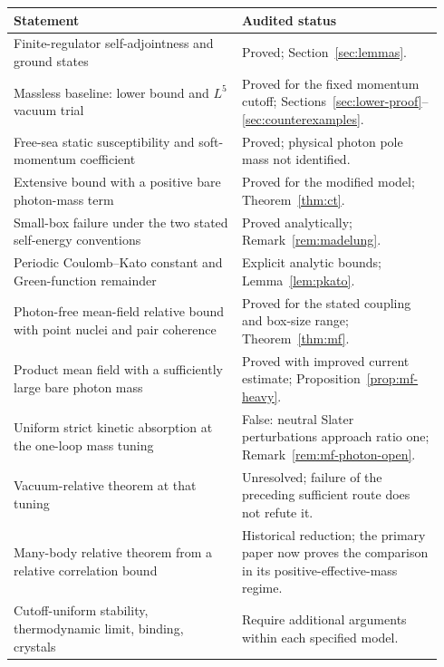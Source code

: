 \small
\noindent
\begin{tabular}{@{}>{\raggedright\arraybackslash}p{0.50\linewidth}
>{\raggedright\arraybackslash}p{0.44\linewidth}@{}}
\toprule
Statement & Audited status\\
\midrule
Finite-regulator self-adjointness and ground states
& Proved; Section~\ref{sec:lemmas}.\\[0.45em]
Massless baseline: lower bound and \(L^5\) vacuum trial
& Proved for the fixed momentum cutoff; Sections~\ref{sec:lower-proof}--\ref{sec:counterexamples}.\\[0.45em]
Free-sea static susceptibility and soft-momentum coefficient
& Proved; physical photon pole mass not identified.\\[0.45em]
Extensive bound with a positive bare photon-mass term
& Proved for the modified model; Theorem~\ref{thm:ct}.\\[0.45em]
Small-box failure under the two stated self-energy conventions
& Proved analytically; Remark~\ref{rem:madelung}.\\[0.45em]
Periodic Coulomb--Kato constant and Green-function remainder
& Explicit analytic bounds; Lemma~\ref{lem:pkato}.\\[0.45em]
Photon-free mean-field relative bound with point nuclei and pair coherence
& Proved for the stated coupling and box-size range; Theorem~\ref{thm:mf}.\\[0.45em]
Product mean field with a sufficiently large bare photon mass
& Proved with improved current estimate; Proposition~\ref{prop:mf-heavy}.\\[0.45em]
Uniform strict kinetic absorption at the one-loop mass tuning
& False: neutral Slater perturbations approach ratio one;
Remark~\ref{rem:mf-photon-open}.\\[0.45em]
Vacuum-relative theorem at that tuning
& Unresolved; failure of the preceding sufficient route does not refute it.\\[0.45em]
Many-body relative theorem from a relative correlation bound
& Historical reduction; the primary paper now proves the comparison
in its positive-effective-mass regime.\\[0.45em]
Cutoff-uniform stability, thermodynamic limit, binding, crystals
& Require additional arguments within each specified model.\\
\bottomrule
\end{tabular}
\normalsize


